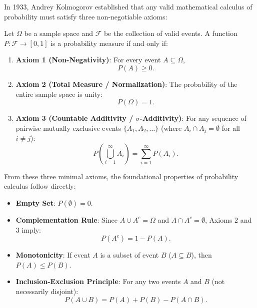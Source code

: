 In 1933, Andrey Kolmogorov established that any valid mathematical calculus of probability must satisfy three non-negotiable axioms:
\begin{definition}
Let $\Omega$ be a sample space and $\mathcal{F}$ be the collection of valid events. A function $P: \mathcal{F} \to [0, 1]$ is a probability measure if and only if:
\begin{enumerate}
  \item \textbf{Axiom 1 (Non-Negativity)}: For every event $A \subseteq \Omega$,
  \begin{equation}
  P(A) \ge 0.
  \label{eq:kolmogorov_nonnegativity}
  \end{equation}
  \item \textbf{Axiom 2 (Total Measure / Normalization)}: The probability of the entire sample space is unity:
  \begin{equation}
  P(\Omega) = 1.
  \label{eq:kolmogorov_normalization}
  \end{equation}
  \item \textbf{Axiom 3 (Countable Additivity / $\sigma$-Additivity)}: For any sequence of pairwise mutually exclusive events $\{A_1, A_2, \dots\}$ (where $A_i \cap A_j = \emptyset$ for all $i \ne j$):
  \begin{equation}
  P\left(\bigcup_{i=1}^\infty A_i\right) = \sum_{i=1}^\infty P(A_i).
  \label{eq:kolmogorov_additivity}
  \end{equation}
\end{enumerate}
\end{definition}

From these three minimal axioms, the foundational properties of probability calculus follow directly:
\begin{itemize}[noitemsep]
  \item \textbf{Empty Set}: $P(\emptyset) = 0$.
  \item \textbf{Complementation Rule}: Since $A \cup A^c = \Omega$ and $A \cap A^c = \emptyset$, Axioms 2 and 3 imply:
  \begin{equation}
  P(A^c) = 1 - P(A).
  \label{eq:complementation_rule}
  \end{equation}
  \item \textbf{Monotonicity}: If event $A$ is a subset of event $B$ ($A \subseteq B$), then $P(A) \le P(B)$.
  \item \textbf{Inclusion-Exclusion Principle}: For any two events $A$ and $B$ (not necessarily disjoint):
  \begin{equation}
  P(A \cup B) = P(A) + P(B) - P(A \cap B).
  \label{eq:inclusion_exclusion_rule}
  \end{equation}
\end{itemize}

